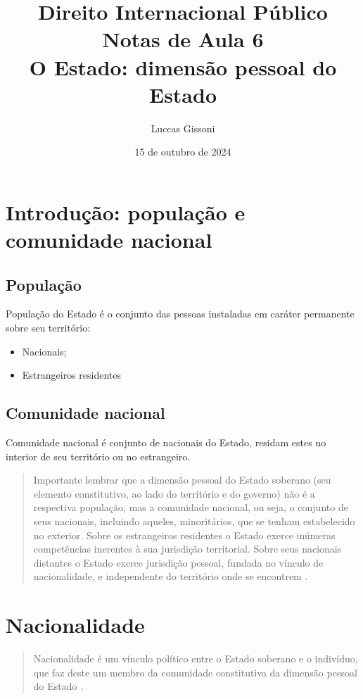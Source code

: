 \documentclass{article}
\title{%
  Direito Internacional Público \\
  \Large Notas de Aula 6\\
  \Large O Estado: dimensão pessoal do Estado\\
  }
\author{Luccas Gissoni}
\date{15 de outubro de 2024}
\begin{document}
\maketitle
\tableofcontents

\section{Introdução: população e comunidade nacional}

\subsection{População}

População do Estado é o conjunto das pessoas instaladas em caráter permanente sobre seu território:

\begin{itemize}
    \item Nacionais;
    \item Estrangeiros residentes
\end{itemize}

\subsection{Comunidade nacional}

Comunidade nacional é conjunto de nacionais do Estado, residam estes no interior de seu território ou no estrangeiro.

\begin{quote}
    Importante lembrar que a dimensão pessoal do Estado soberano (seu elemento constitutivo, ao lado do território e do governo) não é a respectiva população, mas a comunidade nacional, ou seja, o conjunto de seus nacionais, incluindo aqueles, minoritários, que se tenham estabelecido no exterior. Sobre os estrangeiros residentes o Estado exerce inúmeras competências inerentes à sua jurisdição territorial. Sobre seus nacionais distantes o Estado exerce jurisdição pessoal, fundada no vínculo de nacionalidade, e independente do território onde se encontrem \cite[p.~79]{rezek_direito_2024}.
\end{quote}

\section{Nacionalidade}

\begin{quote}
    Nacionalidade é um vínculo político entre o Estado soberano e o indivíduo, que faz deste um membro da comunidade constitutiva da dimensão pessoal do Estado \cite[p.~79]{rezek_direito_2024}.
\end{quote}
\end{document}
